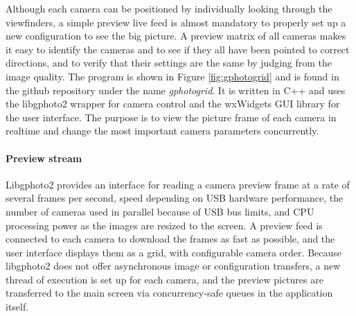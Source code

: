 
Although each camera can be positioned by individually looking through the viewfinders, a simple preview live feed is almost mandatory to properly set up a new configuration to see the big picture.
A preview matrix of all cameras makes it easy to identify the cameras and to see if they all have been pointed to correct directions, and to verify that their settings are the same by judging from the image quality.
The program is shown in Figure \ref{fig:gphotogrid} and is found in the github repository under the name \emph{gphotogrid}.
It is written in C++ and uses the libgphoto2 wrapper for camera control and the wxWidgets GUI library \cite{wxwidgets} for the user interface.
The purpose is to view the picture frame of each camera in realtime and change the most important camera parameters concurrently.

\paragraph{Preview stream}
Libgphoto2 provides an interface for reading a camera preview frame at a rate of several frames per second, speed depending on USB hardware performance, the number of cameras used in parallel because of USB bus limits, and CPU processing power as the images are resized to the screen.
A preview feed is connected to each camera to download the frames as fast as possible, and the user interface displays them as a grid, with configurable camera order.
Because libgphoto2 does not offer asynchronous image or configuration transfers, a new thread of execution is set up for each camera, and the preview pictures are transferred to the main screen via concurrency-safe queues in the application itself.


